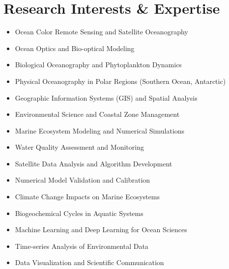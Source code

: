 \documentclass[11pt,a4paper,sans]{moderncv}
\begin{document}






\section{Research Interests \& Expertise}
\begin{itemize}
  \item Ocean Color Remote Sensing and Satellite Oceanography
  \item Ocean Optics and Bio-optical Modeling
  \item Biological Oceanography and Phytoplankton Dynamics
  \item Physical Oceanography in Polar Regions (Southern Ocean, Antarctic)
  \item Geographic Information Systems (GIS) and Spatial Analysis
  \item Environmental Science and Coastal Zone Management
  \item Marine Ecosystem Modeling and Numerical Simulations
  \item Water Quality Assessment and Monitoring
  \item Satellite Data Analysis and Algorithm Development
  \item Numerical Model Validation and Calibration
  \item Climate Change Impacts on Marine Ecosystems
  \item Biogeochemical Cycles in Aquatic Systems
  \item Machine Learning and Deep Learning for Ocean Sciences
  \item Time-series Analysis of Environmental Data
  \item Data Visualization and Scientific Communication
\end{itemize}
\end{document}
